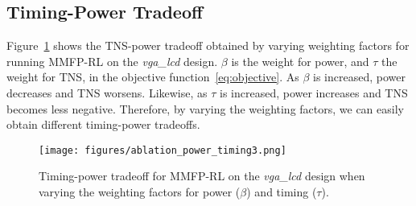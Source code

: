 \subsection{Timing-Power Tradeoff}

Figure~\ref{fig:power_timing_tradeoff} shows the TNS-power tradeoff obtained by varying weighting factors for running MMFP-RL on the \emph{vga\_lcd} design.
$\beta$ is the weight for power, and $\tau$ the weight for TNS, in the objective function~\eqref{eq:objective}. As $\beta$ is increased, power decreases and TNS worsens. Likewise, as $\tau$ is increased, power increases and TNS becomes less negative. Therefore, by varying the weighting factors, we can easily obtain different timing-power tradeoffs.


\begin{figure}[ht] 
\centering
\vspace{-3mm}
\texttt{[image: figures/ablation\_power\_timing3.png]}
\vspace{-3mm}
\caption{Timing-power tradeoff for MMFP-RL on the \emph{vga\_lcd} design when varying the weighting factors for power ($\beta$) and timing ($\tau$).}
\label{fig:power_timing_tradeoff}
\vspace{-3mm}
\end{figure}
